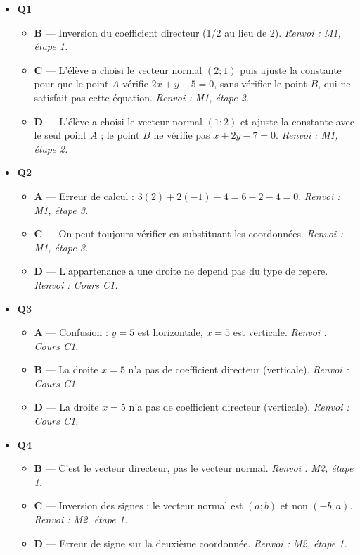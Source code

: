 \begin{itemize}
  \item \textbf{Q1}
  \begin{itemize}
    \item \textbf{B} — Inversion du coefficient directeur (1/2 au lieu de 2). \emph{Renvoi : M1, étape 1.}
    \item \textbf{C} — L'élève a choisi le vecteur normal $(2;1)$ puis ajuste la constante pour que le point $A$ vérifie $2x+y-5=0$, sans vérifier le point $B$, qui ne satisfait pas cette équation. \emph{Renvoi : M1, étape 2.}
    \item \textbf{D} — L'élève a choisi le vecteur normal $(1;2)$ et ajuste la constante avec le seul point $A$ ; le point $B$ ne vérifie pas $x+2y-7=0$. \emph{Renvoi : M1, étape 2.}
  \end{itemize}
  \item \textbf{Q2}
  \begin{itemize}
    \item \textbf{A} — Erreur de calcul : $3(2) + 2(-1) - 4 = 6 - 2 - 4 = 0$. \emph{Renvoi : M1, étape 3.}
    \item \textbf{C} — On peut toujours vérifier en substituant les coordonnées. \emph{Renvoi : M1, étape 3.}
    \item \textbf{D} — L'appartenance a une droite ne depend pas du type de repere. \emph{Renvoi : Cours C1.}
  \end{itemize}
  \item \textbf{Q3}
  \begin{itemize}
    \item \textbf{A} — Confusion : $y = 5$ est horizontale, $x = 5$ est verticale. \emph{Renvoi : Cours C1.}
    \item \textbf{B} — La droite $x = 5$ n'a pas de coefficient directeur (verticale). \emph{Renvoi : Cours C1.}
    \item \textbf{D} — La droite $x = 5$ n'a pas de coefficient directeur (verticale). \emph{Renvoi : Cours C1.}
  \end{itemize}
  \item \textbf{Q4}
  \begin{itemize}
    \item \textbf{B} — C'est le vecteur directeur, pas le vecteur normal. \emph{Renvoi : M2, étape 1.}
    \item \textbf{C} — Inversion des signes : le vecteur normal est $(a ; b)$ et non $(-b ; a)$. \emph{Renvoi : M2, étape 1.}
    \item \textbf{D} — Erreur de signe sur la deuxième coordonnée. \emph{Renvoi : M2, étape 1.}

\end{itemize}
\end{itemize}
